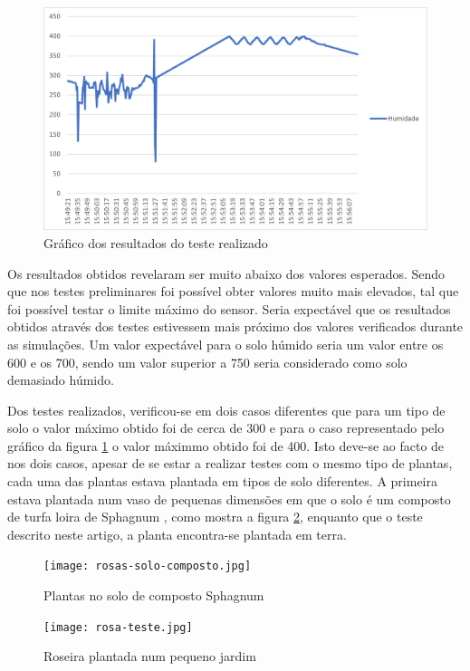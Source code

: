 \documentclass[conference]{IEEEtran}
\begin{document}
\begin{figure}
    \centering
    \includegraphics[scale=0.5]{humidity-test-graph.png}
    \caption{Gráfico dos resultados do teste realizado}
    \label{fig:graphic}
\end{figure}

Os resultados obtidos revelaram ser muito abaixo dos valores esperados. Sendo que nos testes preliminares 
foi possível obter valores muito mais elevados, tal que foi possível testar o limite máximo do sensor. Seria 
expectável que os resultados obtidos através dos testes estivessem mais próximo dos valores verificados 
durante as simulações. Um valor expectável para o solo húmido seria um valor entre os 600 e os 700, sendo 
um valor superior a 750 seria considerado como solo demasiado húmido.

Dos testes realizados, verificou-se em dois casos diferentes que para um tipo de solo o valor máximo obtido foi 
de cerca de 300 e para o caso representado pelo gráfico da figura \ref{fig:graphic} o valor máximmo 
obtido foi de 400.
Isto deve-se ao facto de nos dois casos, apesar de se estar a realizar testes com o mesmo tipo de plantas, 
cada uma das plantas estava plantada em tipos de solo diferentes. A primeira estava plantada num vaso de 
pequenas dimensões em que o solo é um composto de turfa loira de Sphagnum \cite{jardinssintra}, 
como mostra a figura \ref{fig:testconditions}, enquanto que o teste descrito neste artigo, 
a planta encontra-se plantada em terra. 

\begin{figure}[h]
    \centering
    \texttt{[image: rosas-solo-composto.jpg]}
    \caption{Plantas no solo de composto Sphagnum}
    \label{fig:testconditions}
\end{figure}

\begin{figure}[h]
    \centering
    \texttt{[image: rosa-teste.jpg]}
    \caption{Roseira plantada num pequeno jardim}
    \label{fig:roseground}
\end{figure}
\end{document}
